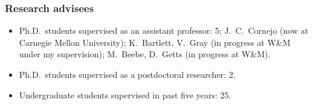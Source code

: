 \documentclass[11pt,letterpaper]{article}
\begin{document}
\subsubsection*{Research advisees}
\begin{itemize}
\setlength{\itemsep}{0pt}
\setlength{\parskip}{0pt}
\setlength{\parsep}{0pt}
\item Ph.D.~students supervised as an assistant professor: 5; J.~C.~Cornejo (now at Carnegie Mellon University); K.~Bartlett, V.~Gray (in progress at W\&M under my supervision); M.~Beebe, D.~Getts (in progress at W\&M).
%
\item Ph.D.~students supervised as a postdoctoral researcher: 2.
%
\item Undergraduate students supervised in past five years: 25.

\end{itemize}


\newpage
\setcounter{page}{1}
%
%
\end{document}
